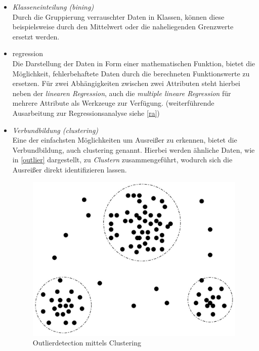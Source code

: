 \begin{itemize}

\item \textit{Klasseneinteilung (bining)}
\\ Durch die Gruppierung verrauschter Daten in Klassen, können diese beispielsweise durch den Mittelwert oder die naheliegenden Grenzwerte ersetzt werden. 

\item \gls{regression}
\\ Die Darstellung der Daten in Form einer mathematischen Funktion, bietet die Möglichkeit, fehlerbehaftete Daten  durch die berechneten Funktionswerte zu ersetzen. Für zwei Abhängigkeiten zwischen zwei Attributen steht hierbei neben der \textit{linearen Regression}, auch die \textit{multiple lineare Regression} für mehrere Attribute als Werkzeuge zur Verfügung. (weiterführende Ausarbeitung zur Regressionsanalyse siehe \vref{ra})

\item \textit{Verbundbildung (clustering)}
\\ Eine der einfachsten Möglichkeiten um Ausreißer zu erkennen, bietet die Verbundbildung, auch \gls{clustering} genannt. Hierbei werden ähnliche Daten, wie in \vref{outlier} dargestellt, zu \textit{Clustern} zusammengeführt, wodurch sich die Ausreißer direkt identifizieren lassen.

\begin{figure}[H]
\centering
\includegraphics[scale=1.2]{se-wa-jpg/outlier}
\caption[Outlierdetection mittels Clustering]{Outlierdetection mittels Clustering\protect\footnotemark}
\label{outlier}
\end{figure}
\end{itemize}

